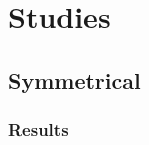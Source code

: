 \documentclass{beamer}
\begin{document}
\section{Studies}
\subsection{Symmetrical}

\subsubsection{Results}
%
\end{document}

